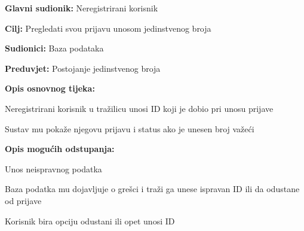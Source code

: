 					\noindent {}
					\begin{packed_item}
	
						\item \textbf{Glavni sudionik: }Neregistrirani korisnik
						\item  \textbf{Cilj:} Pregledati svou prijavu unosom jedinstvenog broja
						\item  \textbf{Sudionici:} Baza podataka
						\item  \textbf{Preduvjet:} Postojanje jedinstvenog broja
						\item  \textbf{Opis osnovnog tijeka:}
						
						\item[] \begin{packed_enum}
	
							\item Neregistrirani korisnik u tražilicu unosi ID koji je dobio pri unosu prijave
							\item Sustav mu pokaže njegovu prijavu i status ako je unesen broj važeći
						\end{packed_enum}
						\item  \textbf{Opis mogućih odstupanja:}
						
						\item[] \begin{packed_item}
	
							\item[1.a] Unos neispravnog podatka
							\item[] \begin{packed_enum}
								
								\item Baza podatka mu dojavljuje o grešci i traži ga unese ispravan ID ili da odustane od prijave
								\item Korisnik bira opciju odustani ili opet unosi ID	
							\end{packed_enum}
						\end{packed_item}
						
					\end{packed_item}
					
